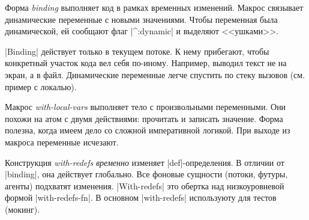 Форма \emph{binding} выполняет код в рамках временных изменений. Макрос
связывает динамические переменные с новыми значениями. Чтобы переменная была
динамической, ей сообщают флаг \spverb|^:dynamic| и выделяют
<<ушками>>.

\spverb|Binding| действует только в текущем потоке. К нему прибегают, чтобы
конкретный участок кода вел себя по-иному. Например, выводил текст не на экран,
а в файл. Динамические переменные легче спустить по стеку вызовов (см. пример с
локалью).

Макрос \emph{with-local-vars} выполняет тело с произвольными переменными. Они
похожи на атом с двумя действиями: прочитать и записать значение. Форма полезна,
когда имеем дело со сложной императивной логикой. При выходе из макроса
переменные исчезают.

Конструкция \emph{with-redefs} \emph{временно} изменяет
\spverb|def|-определения. В отличии от \spverb|binding|, она действует
глобально. Все фоновые сущности (потоки, футуры, агенты) подхватят
изменения. \spverb|With-redefs| это обертка над низкоуровневой формой
\spverb|with-redefs-fn|. В основном \spverb|with-redefs| используюту для тестов
(мокинг).
